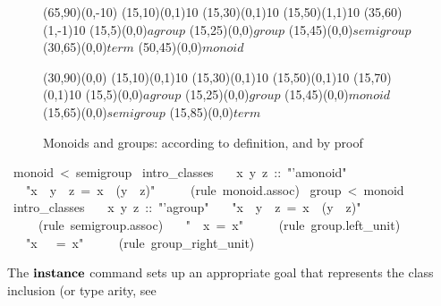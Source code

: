\begin{isabelle}
\begin{isamarkuptext}
 \begin{figure}[htbp]
   \begin{center}
     \small
     \unitlength 0.6mm
     \begin{picture}(65,90)(0,-10)
       \put(15,10){\line(0,1){10}} \put(15,30){\line(0,1){10}}
       \put(15,50){\line(1,1){10}} \put(35,60){\line(1,-1){10}}
       \put(15,5){\makebox(0,0){$agroup$}}
       \put(15,25){\makebox(0,0){$group$}}
       \put(15,45){\makebox(0,0){$semigroup$}}
       \put(30,65){\makebox(0,0){$term$}} \put(50,45){\makebox(0,0){$monoid$}}
     \end{picture}
     \hspace{4em}
     \begin{picture}(30,90)(0,0)
       \put(15,10){\line(0,1){10}} \put(15,30){\line(0,1){10}}
       \put(15,50){\line(0,1){10}} \put(15,70){\line(0,1){10}}
       \put(15,5){\makebox(0,0){$agroup$}}
       \put(15,25){\makebox(0,0){$group$}}
       \put(15,45){\makebox(0,0){$monoid$}}
       \put(15,65){\makebox(0,0){$semigroup$}}
       \put(15,85){\makebox(0,0){$term$}}
     \end{picture}
     \caption{Monoids and groups: according to definition, and by proof}
     \label{fig:monoid-group}
   \end{center}
 \end{figure}%
\end{isamarkuptext}%
~monoid~<~semigroup\isanewline
{}~intro\_classes\isanewline
~~~x~y~z~::~{"}'a{\isasymColon}monoid{"}\isanewline
~~~{"}x~{\isasymOtimes}~y~{\isasymOtimes}~z~=~x~{\isasymOtimes}~(y~{\isasymOtimes}~z){"}\isanewline
~~~~~(rule~monoid.assoc)\isanewline
{}\isanewline
\isanewline
{}~group~<~monoid\isanewline
{}~intro\_classes\isanewline
~~~x~y~z~::~{"}'a{\isasymColon}group{"}\isanewline
~~~{"}x~{\isasymOtimes}~y~{\isasymOtimes}~z~=~x~{\isasymOtimes}~(y~{\isasymOtimes}~z){"}\isanewline
~~~~~(rule~semigroup.assoc)\isanewline
~~~{"}{\isasymunit}~{\isasymOtimes}~x~=~x{"}\isanewline
~~~~~(rule~group.left\_unit)\isanewline
~~~{"}x~{\isasymOtimes}~{\isasymunit}~=~x{"}\isanewline
~~~~~(rule~group\_right\_unit)\isanewline
{}%
\begin{isamarkuptext}%
\medskip The $\emph{\bf instance}$ command sets up an appropriate
 goal that represents the class inclusion (or type arity, see

\end{isamarkuptext}
\end{isabelle}
